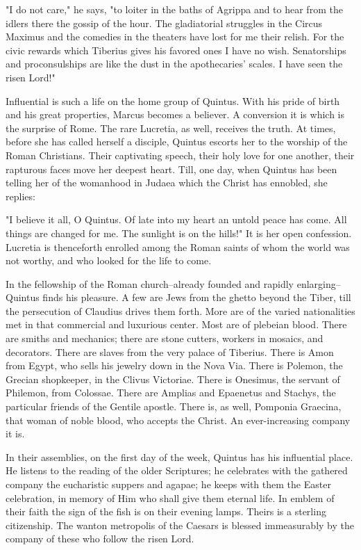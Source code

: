 "I do not care," he says, "to loiter in the baths of Agrippa and to
hear from the idlers there the gossip of the hour.  The
gladiatorial struggles in the Circus Maximus and the comedies in
the theaters have lost for me their relish.  For the civic rewards
which Tiberius gives his favored ones I have no wish.  Senatorships
and proconsulships are like the dust in the apothecaries' scales.
I have seen the risen Lord!"

Influential is such a life on the home group of Quintus.  With his
pride of birth and his great properties, Marcus becomes a believer.
A conversion it is which is the surprise of Rome.  The rare
Lucretia, as well, receives the truth.  At times, before she has
called herself a disciple, Quintus escorts her to the worship of
the Roman Christians.  Their captivating speech, their holy love
for one another, their rapturous faces move her deepest heart.
Till, one day, when Quintus has been telling her of the womanhood
in Judaea which the Christ has ennobled, she replies:

"I believe it all, O Quintus.  Of late into my heart an untold
peace has come.  All things are changed for me.  The sunlight is on
the hills!"  It is her open confession.  Lucretia is thenceforth
enrolled among the Roman saints of whom the world was not worthy,
and who looked for the life to come.


In the fellowship of the Roman church--already founded and rapidly
enlarging--Quintus finds his pleasure.  A few are Jews from the
ghetto beyond the Tiber, till the persecution of Claudius drives
them forth.  More are of the varied nationalities met in that
commercial and luxurious center.  Most are of plebeian blood.
There are smiths and mechanics; there are stone cutters, workers in
mosaics, and decorators.  There are slaves from the very palace of
Tiberius.  There is Amon from Egypt, who sells his jewelry down in
the Nova Via.  There is Polemon, the Grecian shopkeeper, in the
Clivus Victoriae.  There is Onesimus, the servant of Philemon, from
Colossae.  There are Amplias and Epaenetus and Stachys, the
particular friends of the Gentile apostle.  There is, as well,
Pomponia Graecina, that woman of noble blood, who accepts the
Christ.  An ever-increasing company it is.

In their assemblies, on the first day of the week, Quintus has his
influential place.  He listens to the reading of the older
Scriptures; he celebrates with the gathered company the eucharistic
suppers and agapae; he keeps with them the Easter celebration, in
memory of Him who shall give them eternal life.  In emblem of their
faith the sign of the fish is on their evening lamps.  Theirs is a
sterling citizenship.  The wanton metropolis of the Caesars is
blessed immeasurably by the company of these who follow the risen
Lord.

